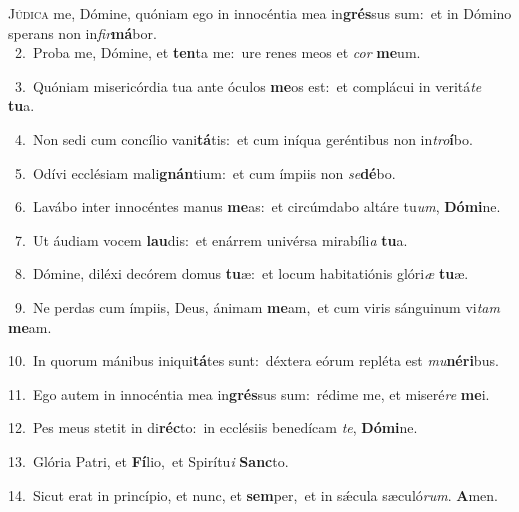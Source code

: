 \lettrine{\initial\textcolor{\initialcolor}{J}}{údica} me, Dómine, quóniam ego in innocéntia mea in\-\textbf{grés}\-sus sum:~\star et in Dómino sperans non in\-\textit{fir}\-\textbf{má}bor.\\
{\numbfont\textcolor{\numbcolor}{~2.}}~Proba me, Dómine, et \textbf{ten}\-ta me:~\star ure renes meos et \textit{cor} \textbf{me}\-um.\par
{\numbfont\textcolor{\numbcolor}{~3.}}~Quóniam misericórdia tua ante óculos \textbf{me}\-os est:~\star et complácui in veritá\textit{te} \textbf{tu}\-a.\par
{\numbfont\textcolor{\numbcolor}{~4.}}~Non sedi cum concílio vani\-\textbf{tá}\-tis:~\star et cum iníqua geréntibus non in\-\textit{tro}\-\textbf{í}bo.\par
{\numbfont\textcolor{\numbcolor}{~5.}}~Odívi ecclésiam mali\-\textbf{gnán}\-tium:~\star et cum ímpiis non \textit{se}\-\textbf{dé}bo.\par
{\numbfont\textcolor{\numbcolor}{~6.}}~Lavábo inter innocéntes manus \textbf{me}\-as:~\star et circúmdabo altáre tu\-\textit{um}\-, \textbf{Dó}\-\textbf{mi}ne.\par
{\numbfont\textcolor{\numbcolor}{~7.}}~Ut áudiam vocem \textbf{lau}\-dis:~\star et enárrem univérsa mirabíli\textit{a} \textbf{tu}\-a.\par
{\numbfont\textcolor{\numbcolor}{~8.}}~Dómine, diléxi decórem domus \textbf{tu}\-æ:~\star et locum habitatiónis glóri\textit{æ} \textbf{tu}\-æ.\par
{\numbfont\textcolor{\numbcolor}{~9.}}~Ne perdas cum ímpiis, Deus, ánimam \textbf{me}\-am,~\star et cum viris sánguinum vi\textit{tam} \textbf{me}\-am.\par
{\numbfont\textcolor{\numbcolor}{10.}}~In quorum mánibus iniqui\-\textbf{tá}\-tes sunt:~\star déxtera eórum repléta est \textit{mu}\-\textbf{né}\textbf{ri}bus.\par
{\numbfont\textcolor{\numbcolor}{11.}}~Ego autem in innocéntia mea in\-\textbf{grés}\-sus sum:~\star rédime me, et miseré\textit{re} \textbf{me}\-i.\par
{\numbfont\textcolor{\numbcolor}{12.}}~Pes meus stetit in di\-\textbf{réc}\-to:~\star in ecclésiis benedícam \textit{te}\-, \textbf{Dó}\-\textbf{mi}ne.\par
{\numbfont\textcolor{\numbcolor}{13.}}~Glória Patri, et \textbf{Fí}\-lio,~\star et Spirítu\textit{i} \textbf{Sanc}\-to.\par
{\numbfont\textcolor{\numbcolor}{14.}}~Sicut erat in princípio, et nunc, et \textbf{sem}\-per,~\star et in sǽcula sæculó\-\textit{rum}\-. \textbf{A}\-men.\par
